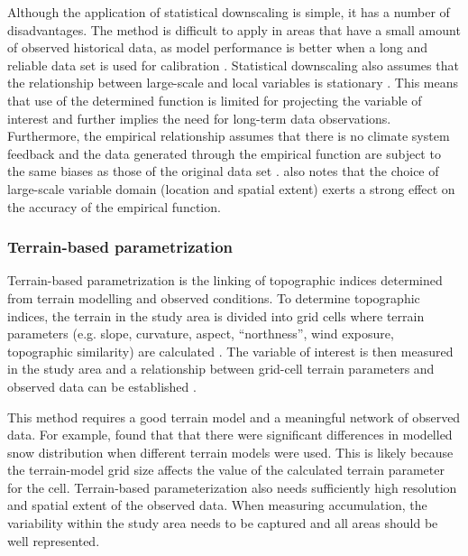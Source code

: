 \documentclass{sfuthesis}
\begin{document}
Although the application of statistical downscaling is simple, it has a number of disadvantages. The method is difficult to apply in areas that have a small amount of observed historical data, as model performance is better when a long and reliable data set is used for calibration  \citep{Fowler2007}. Statistical downscaling also assumes that the relationship between large-scale and local variables is stationary \citep{Fowler2007}. This means that use of the determined function is limited for projecting the variable of interest and further implies the need for long-term data observations. Furthermore, the empirical relationship assumes that there is no climate system feedback and the data generated through the empirical function are subject to the same biases as those of the original data set \citep{Fowler2007}. \cite{Wilby2000} also notes that the choice of large-scale variable domain (location and spatial extent) exerts a strong effect on the accuracy of the empirical function.

\subsubsection{Terrain-based parametrization}
Terrain-based parametrization is the linking of topographic indices determined from terrain modelling and observed conditions. To determine topographic indices, the terrain in the study area is divided into grid cells where terrain parameters (e.g. slope, curvature, aspect, ``northness'', wind exposure, topographic similarity) are calculated \citep{Anderson2014,McGrath2015}. The variable of interest is then measured in the study area and a relationship between grid-cell terrain parameters and observed data can be established \citep[e.g.][]{Bloschl1991, Liston1998, Anderton2004,McGrath2015}. 

This method requires a good terrain model and a meaningful network of observed data. For example, \cite{Molotch2005} found that that there were significant differences in modelled snow distribution when different terrain models were used. This is likely because the terrain-model grid size affects the value of the calculated terrain parameter for the cell. Terrain-based parameterization also needs sufficiently high resolution and spatial extent of the observed data. When measuring accumulation, the variability within the study area needs to be captured and all areas should be well represented. 
\end{document}
